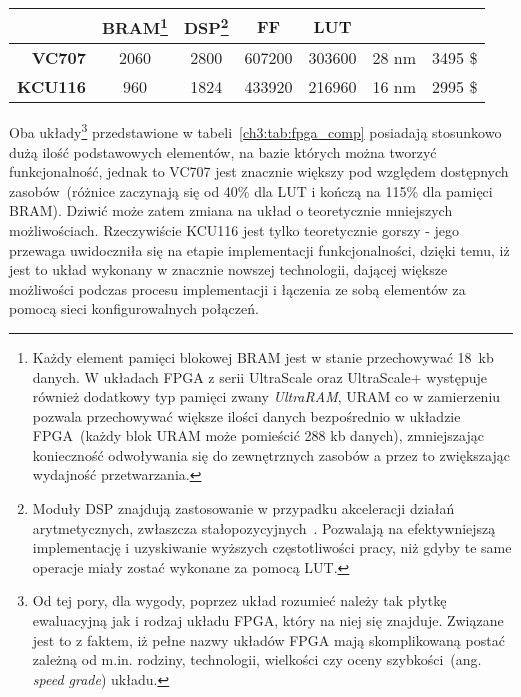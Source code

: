 \begin{enumerate}
\begin{savenotes}
\begin{table}[H]
\begin{tabular}{|r|c|c|c|c|c|c|}
                  & BRAM\footnote{Każdy element pamięci blokowej BRAM jest w stanie przechowywać 18~kb danych. W układach FPGA z serii UltraScale oraz UltraScale+ występuje również dodatkowy typ pamięci zwany \textit{UltraRAM}, URAM co w zamierzeniu pozwala przechowywać większe ilości danych bezpośrednio w układzie FPGA~(każdy blok URAM może pomieścić 288 kb danych), zmniejszając konieczność odwoływania się do zewnętrznych zasobów a przez to zwiększając wydajność przetwarzania. }      & DSP\footnote{Moduły DSP znajdują zastosowanie w przypadku akceleracji działań arytmetycznych, zwłaszcza stałopozycyjnych~\cite{DSP48E1}\cite{DSP48E2}. Pozwalają na efektywniejszą implementację i uzyskiwanie wyższych częstotliwości pracy, niż gdyby te same operacje miały zostać wykonane za pomocą LUT.}       & FF         & LUT        &                                                 &                                 \\ \hline
\textbf{VC707}    & 2060      & 2800      & 607200     & 303600     & 28 nm                                           & 3495 \$                         \\ \hline
\textbf{KCU116}   & 960       & 1824      & 433920     & 216960     & 16 nm                                           & 2995 \$                         \\ \hline
\end{tabular}
\end{table}
\end{savenotes}
Oba układy\footnote{Od tej pory, dla wygody, poprzez układ rozumieć należy tak płytkę ewaluacyjną jak i rodzaj układu FPGA, który na niej się znajduje. Związane jest to z faktem, iż pełne nazwy układów FPGA mają skomplikowaną postać zależną od m.in. rodziny, technologii, wielkości czy oceny szybkości~(ang. \textit{speed grade}) układu.} przedstawione w tabeli~\ref{ch3:tab:fpga_comp} posiadają stosunkowo dużą ilość podstawowych elementów, na bazie których można tworzyć funkcjonalność, jednak to VC707 jest znacznie większy pod względem dostępnych zasobów~(różnice zaczynają się od 40\% dla LUT i kończą na 115\% dla pamięci BRAM). Dziwić może zatem zmiana na układ o teoretycznie mniejszych możliwościach. Rzeczywiście KCU116 jest tylko teoretycznie gorszy - jego przewaga uwidoczniła się na etapie implementacji funkcjonalności, dzięki temu, iż jest to układ wykonany w znacznie nowszej technologii, dającej większe możliwości podczas procesu implementacji i łączenia ze sobą elementów za pomocą sieci konfigurowalnych połączeń.

\end{enumerate}
